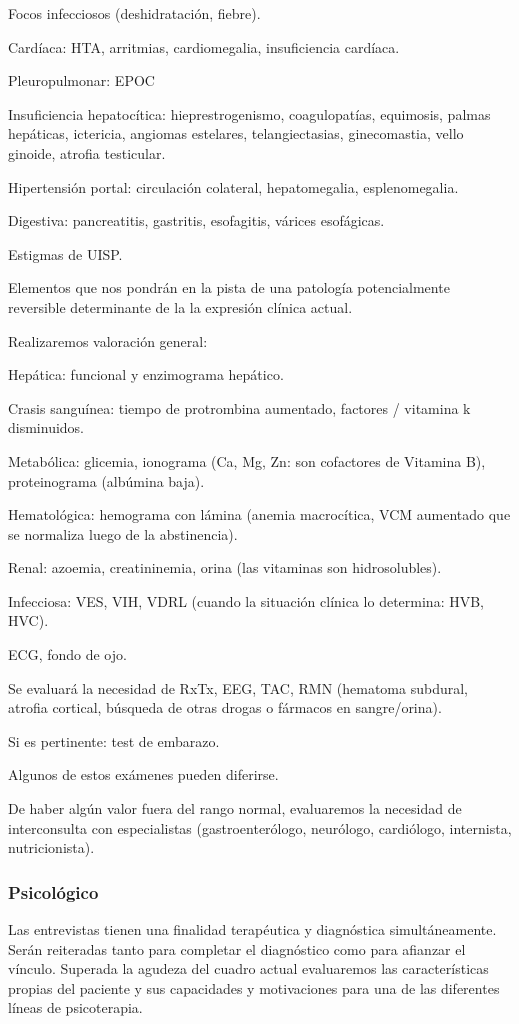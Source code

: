 \documentclass{scrbook}
\begin{document}
Focos infecciosos (deshidratación, fiebre).

Cardíaca: HTA, arritmias, cardiomegalia, insuficiencia cardíaca.

Pleuropulmonar: EPOC

Insuficiencia hepatocítica: hieprestrogenismo, coagulopatías, equimosis, palmas hepáticas, ictericia, angiomas estelares, telangiectasias, ginecomastia, vello ginoide, atrofia testicular.

Hipertensión portal: circulación colateral, hepatomegalia, esplenomegalia.

Digestiva: pancreatitis, gastritis, esofagitis, várices esofágicas.

Estigmas de UISP.

Elementos que nos pondrán en la pista de una patología potencialmente reversible determinante de la la expresión clínica actual.

Realizaremos valoración general:

Hepática: funcional y enzimograma hepático.

Crasis sanguínea: tiempo de protrombina aumentado, factores / vitamina k disminuidos.

Metabólica: glicemia, ionograma (Ca, Mg, Zn: son cofactores de Vitamina B), proteinograma (albúmina baja).

Hematológica: hemograma con lámina (anemia macrocítica, VCM aumentado que se normaliza luego de la abstinencia).

Renal: azoemia, creatininemia, orina (las vitaminas son hidrosolubles).

Infecciosa: VES, VIH, VDRL (cuando la situación clínica lo determina: HVB, HVC).

ECG, fondo de ojo.

Se evaluará la necesidad de RxTx, EEG, TAC, RMN (hematoma subdural, atrofia cortical, búsqueda de otras drogas o fármacos en sangre/orina).

Si es pertinente: test de embarazo.

Algunos de estos exámenes pueden diferirse.

De haber algún valor fuera del rango normal, evaluaremos la necesidad de interconsulta con especialistas (gastroenterólogo, neurólogo, cardiólogo, internista, nutricionista).

\subsubsection*{Psicológico}
Las entrevistas tienen una finalidad terapéutica y diagnóstica simultáneamente. Serán reiteradas tanto para completar el diagnóstico como para afianzar el vínculo. Superada la agudeza del cuadro actual evaluaremos las características propias del paciente y sus capacidades y motivaciones para una de las diferentes líneas de psicoterapia.
\end{document}
